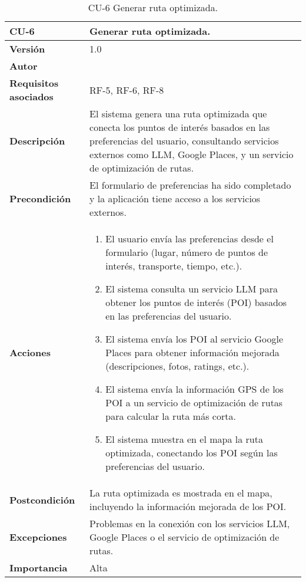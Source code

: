 \begin{table}[p]
	\centering
	\begin{tabularx}{\linewidth}{ p{} p{} }
		\toprule
		\textbf{CU-6}    & \textbf{Generar ruta optimizada.}\\
		\toprule
		\textbf{Versión}              & 1.0    \\
		\textbf{Autor}                & \autor \\
		\textbf{Requisitos asociados} & RF-5, RF-6, RF-8 \\
		\textbf{Descripción}          & El sistema genera una ruta optimizada que conecta los puntos de interés basados en las preferencias del usuario, consultando servicios externos como LLM, Google Places, y un servicio de optimización de rutas. \\
		\textbf{Precondición}         & El formulario de preferencias ha sido completado y la aplicación tiene acceso a los servicios externos. \\
		\textbf{Acciones}             &
		\begin{enumerate}
			\def\labelenumi{\arabic{enumi}.}
			\tightlist
			\item El usuario envía las preferencias desde el formulario (lugar, número de puntos de interés, transporte, tiempo, etc.).
			\item El sistema consulta un servicio LLM para obtener los puntos de interés (POI) basados en las preferencias del usuario.
			\item El sistema envía los POI al servicio Google Places para obtener información mejorada (descripciones, fotos, ratings, etc.).
			\item El sistema envía la información GPS de los POI a un servicio de optimización de rutas para calcular la ruta más corta.
			\item El sistema muestra en el mapa la ruta optimizada, conectando los POI según las preferencias del usuario.
		\end{enumerate}\\
		\textbf{Postcondición}        & La ruta optimizada es mostrada en el mapa, incluyendo la información mejorada de los POI. \\
		\textbf{Excepciones}          & Problemas en la conexión con los servicios LLM, Google Places o el servicio de optimización de rutas. \\
		\textbf{Importancia}          & Alta \\
		\bottomrule
	\end{tabularx}
	\caption{CU-6 Generar ruta optimizada.}
\end{table}



